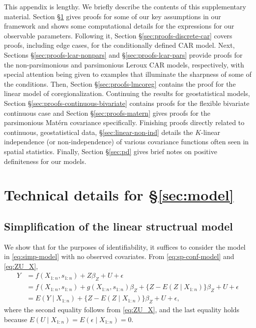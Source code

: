 \documentclass[11pt]{article}
\theoremstyle{definition}
\theoremstyle{remark}
\begin{document}
This appendix is lengthy. We briefly describe the contents of this supplementary material. Section \S \ref{sec:proofs-framework} gives proofs for some of our key assumptions in our framework and shows some computational details for the expressions for our observable parameters. Following it, Section \S \ref{sec:proofs-discrete-car} covers proofs, including edge cases, for the conditionally defined CAR model. Next, Sections \S \ref{sec:proofs-lcar-nonpars} and \S \ref{sec:proofs-lcar-pars} provide proofs for the non-parsimonious and parsimonious Leroux CAR models, respectively, with special attention being given to examples that illuminate the sharpness of some of the conditions. Then, Section \S \ref{sec:proofs-lmcoreg} contains the proof for the linear model of coregionalization. Continuing the results for geostatistical models, Section \S \ref{sec:proofs-continuous-bivariate} contains proofs for the flexible bivariate continuous case and Section \S \ref{sec:proofs-matern} gives proofs for the parsimonious Mat\'ern covariance specifically. Finishing proofs directly related to continuous, geostatistical data, \S \ref{sec:linear-non-ind} details the $K$-linear independence (or non-independence) of various covariance functions often seen in spatial statistics. 
Finally, Section \S \ref{sec:pd} gives brief notes on positive definiteness for our models.

\section{Technical details for \S \ref{sec:model}}\label{sec:proofs-framework}

\subsection{Simplification of the linear structrual model}\label{sec:no-measured-covariates}
We show that for the purposes of identifiability, it suffices to consider the model in \eqref{eq:simp-model} with no observed covariates. 
From \eqref{eq:sp-conf-model} and \eqref{eq:ZU_X}, 
\begin{align*}
    Y 
    & = 
    f(X_{1:n}, s_{1:n}) + Z \beta_Z + U + \epsilon\\
    & = f(X_{1:n}, s_{1:n}) + g(X_{1:n}, s_{1:n}) \beta_Z + \{ Z - E(Z\mid X_{1:n}) \} \beta_Z + U + \epsilon\\
    & = E(Y\mid X_{1:n}) + \{ Z - E(Z\mid X_{1:n}) \} \beta_Z + U + \epsilon,
\end{align*}
where the second equality follows from \eqref{eq:ZU_X}, and the last equality holds because $E(U\mid X_{1:n}) = E(\epsilon \mid X_{1:n}) = 0$. 
\end{document}
